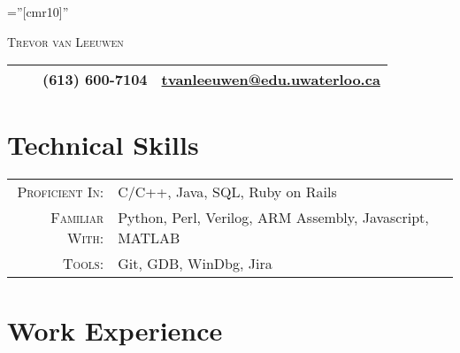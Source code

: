 \documentclass[a4paper,10pt]{article}
\newcommand\Tstrut{\rule{0pt}{2.9ex}}         %
\newcommand\Bstrut{\rule[-1.2ex]{0pt}{0pt}}   %
\newcommand\TBstrut{\Tstrut\Bstrut}           %
\begin{document}
\pagestyle{empty} %

\font\fb=''[cmr10]'' %

\par{\centering
		{\Huge \textsc{Trevor van Leeuwen}
	}\bigskip\par}
\par{
	\begin{tabularx}{\textwidth}{c X c c}
		\hline
		& &
		(613) 600-7104 & \href{mailto:tvanleeuwen@edu.uwaterloo.ca}{tvanleeuwen@edu.uwaterloo.ca} \TBstrut \\
		\hline
	\end{tabularx}
}
\section{Technical Skills}

\begin{tabular}{rl}
    \textsc{Proficient In:} & C/C++, Java, SQL, Ruby on Rails \\
    \textsc{Familiar With:} & Python, Perl, Verilog, ARM Assembly, Javascript, MATLAB \\
   	\textsc{Tools:} & Git, GDB, WinDbg, Jira \\
\end{tabular}

\section{Work Experience}


\end{document}
